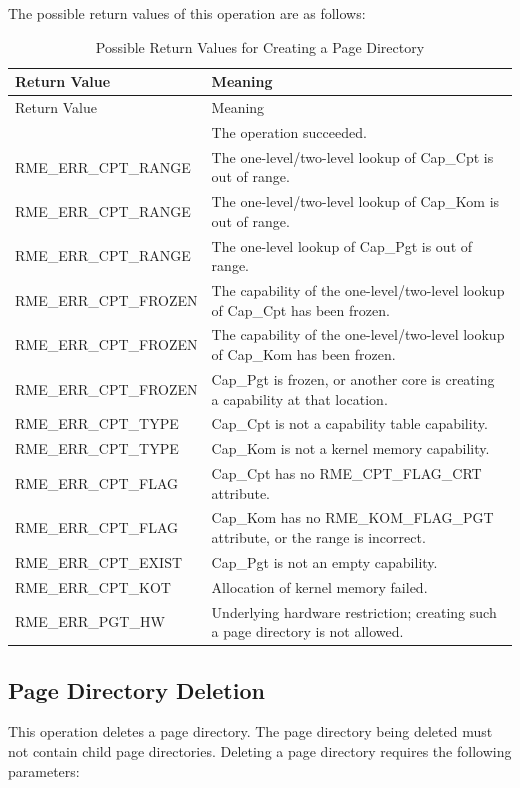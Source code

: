The possible return values of this operation are as follows:

\begin{xltabular}{\textwidth}{@{}>{\hsize\raggedright\arraybackslash}X>{\hsize\raggedright\arraybackslash}X@{}}
\caption{Possible Return Values for Creating a Page Directory}\label{tab:3-11-create-page-directory-return-values}\\
\toprule
Return Value & Meaning\tabularnewline
\endfirsthead
\toprule
Return Value & Meaning\tabularnewline
\midrule
\endhead
\bottomrule
{} & The operation succeeded.\tabularnewline
    RME\_ERR\_CPT\_RANGE & The one-level/two-level lookup of Cap\_Cpt is out of range.\tabularnewline
    RME\_ERR\_CPT\_RANGE & The one-level/two-level lookup of Cap\_Kom is out of range.\tabularnewline
    RME\_ERR\_CPT\_RANGE & The one-level lookup of Cap\_Pgt is out of range.\tabularnewline
    RME\_ERR\_CPT\_FROZEN & The capability of the one-level/two-level lookup of Cap\_Cpt has been frozen.\tabularnewline
    RME\_ERR\_CPT\_FROZEN & The capability of the one-level/two-level lookup of Cap\_Kom has been frozen.\tabularnewline
    RME\_ERR\_CPT\_FROZEN & Cap\_Pgt is frozen, or another core is creating a capability at that location.\tabularnewline
    RME\_ERR\_CPT\_TYPE & Cap\_Cpt is not a capability table capability.\tabularnewline
    RME\_ERR\_CPT\_TYPE & Cap\_Kom is not a kernel memory capability.\tabularnewline
    RME\_ERR\_CPT\_FLAG & Cap\_Cpt has no RME\_CPT\_FLAG\_CRT attribute.\tabularnewline
    RME\_ERR\_CPT\_FLAG & Cap\_Kom has no RME\_KOM\_FLAG\_PGT attribute, or the range is incorrect.\tabularnewline
    RME\_ERR\_CPT\_EXIST & Cap\_Pgt is not an empty capability.\tabularnewline
    RME\_ERR\_CPT\_KOT & Allocation of kernel memory failed.\tabularnewline
    RME\_ERR\_PGT\_HW & Underlying hardware restriction; creating such a page directory is not allowed.\tabularnewline
\end{xltabular}
\nopagebreak[4]

\subsection{Page Directory Deletion}\label{subsec:3-delete-page-directory}
\nopagebreak[4]

This operation deletes a page directory. The page directory being deleted must not contain child page directories. Deleting a page directory requires the following parameters:


